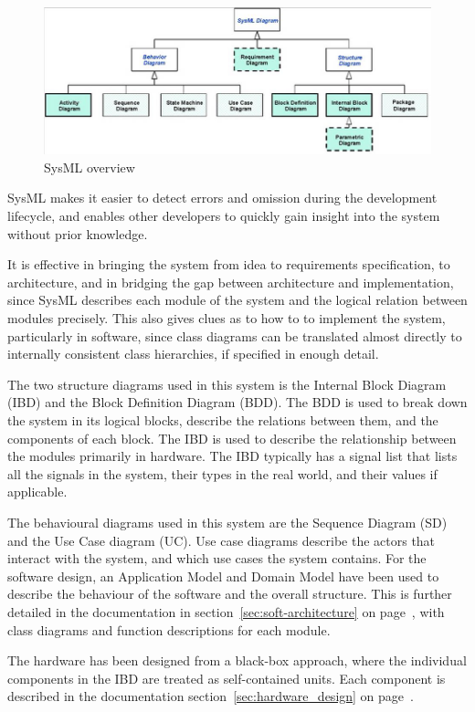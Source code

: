 \begin{figure}[H]
	\centering
	\includegraphics[max width=1\linewidth]{SysML.png}
	\caption{SysML overview\cite{SysML}}
	\label{fig:SysML}
\end{figure}

SysML makes it easier to detect errors and omission during the development lifecycle\cite{SysML_faq}, and enables other developers to quickly gain insight into the system without prior knowledge. 

It is effective in bringing the system from idea to requirements specification, to architecture, and in bridging the gap between architecture and implementation, since SysML describes each module of the system and the logical relation between modules precisely. This also gives clues as to how to to implement the system, particularly in software, since class diagrams can be translated almost directly to internally consistent class hierarchies, if specified in enough detail.

The two structure diagrams used in this system is the Internal Block Diagram (IBD) and the Block Definition Diagram (BDD). The BDD is used to break down the system in its logical blocks, describe the relations between them, and the components of each block. The IBD is used to describe the relationship between the modules primarily in hardware. The IBD typically has a signal list that lists all the signals in the system, their types in the real world, and their values if applicable.

The behavioural diagrams used in this system are the Sequence Diagram (SD) and the Use Case diagram (UC). Use case diagrams describe the actors that interact with the system, and which use cases the system contains. For the software design, an Application Model and Domain Model have been used to describe the behaviour of the software and the overall structure. This is further detailed in the documentation in section~\ref{sec:soft-architecture} on page~\pageref{sec:soft-architecture}, with class diagrams and function descriptions for each module.

The hardware has been designed from a black-box approach, where the individual components in the IBD are treated as self-contained units. Each component is described in the documentation section~\ref{sec:hardware_design} on page~\pageref{sec:hardware_design}.


